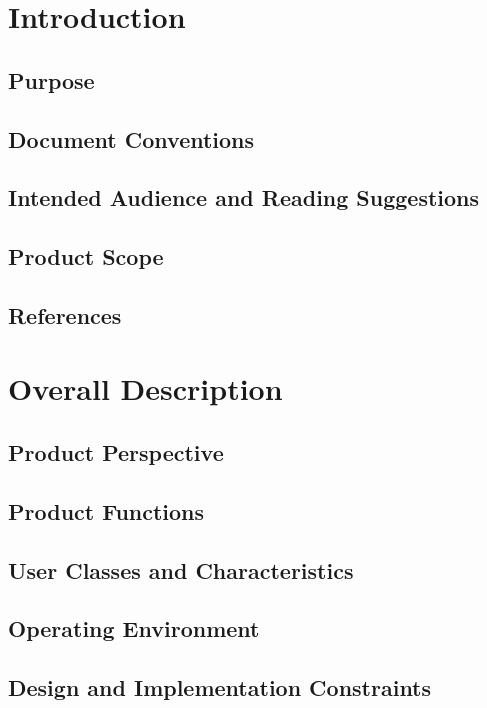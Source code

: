 \chapter{Introduction}
\label{ch:intro}

\section{Purpose}
\section{Document Conventions}
\section{Intended Audience and Reading Suggestions}
\section{Product Scope}
\section{References}


\chapter{Overall Description}
\label{Overall Description}

\section{Product Perspective}

\section{Product Functions}


\section{User Classes and Characteristics}


\section{Operating Environment}

\section{Design and Implementation Constraints}

